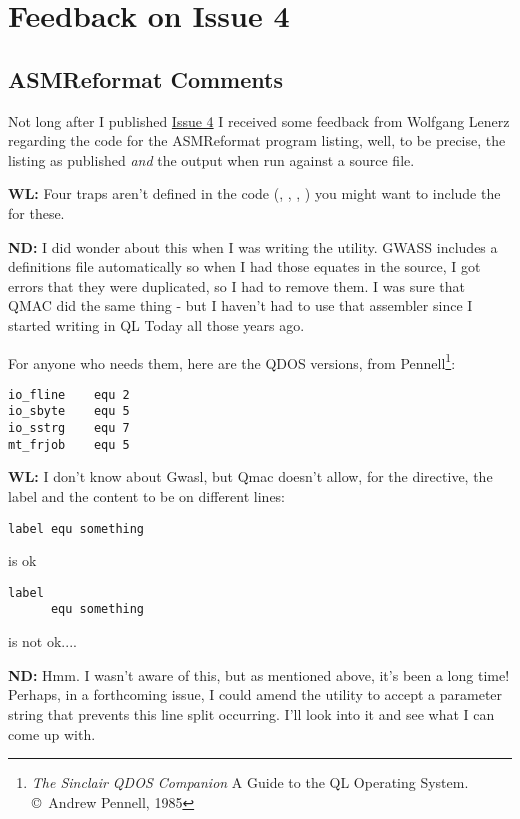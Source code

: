 \chapter{Feedback on Issue 4}
\section{ASMReformat Comments}
Not long after I published \href{http://qdosmsq.dunbar-it.co.uk/downloads/AssemblyLanguage/Issue\_004/Assembly\_Language\_004.pdf}{Issue 4} I received some feedback from Wolfgang Lenerz regarding the code for the ASMReformat program listing, well, to be precise, the listing as published \emph{and} the output when run against a source file.

\textbf{WL:} Four traps aren't defined in the code (, , , ) you might want to include the  for these.

\textbf{ND:} I did wonder about this when I was writing the utility. GWASS includes a definitions file automatically so when I had those equates in the source, I got errors that they were duplicated, so I had to remove them. I was sure that QMAC did the same thing - but I haven't had to use that assembler since I started writing in QL Today all those years ago.

For anyone who needs them, here are the QDOS versions, from Pennell\footnote{\emph{The Sinclair QDOS Companion} A Guide to the QL Operating System.  \copyright{}~Andrew Pennell, 1985}:

\begin{verbatim}
io_fline    equ 2
io_sbyte    equ 5
io_sstrg    equ 7
mt_frjob    equ 5
\end{verbatim}


\textbf{WL:} I don't know about Gwasl, but Qmac doesn't allow, for the  directive, the label and the content to be on different lines:

\begin{verbatim}
label equ something
\end{verbatim}

is ok

\begin{verbatim}
label 
      equ something
\end{verbatim}

is not ok....

\textbf{ND:} Hmm. I wasn't aware of this, but as mentioned above, it's been a long time! Perhaps, in a forthcoming issue, I could amend the utility to accept a parameter string that prevents this line split occurring. I'll look into it and see what I can come up with.


